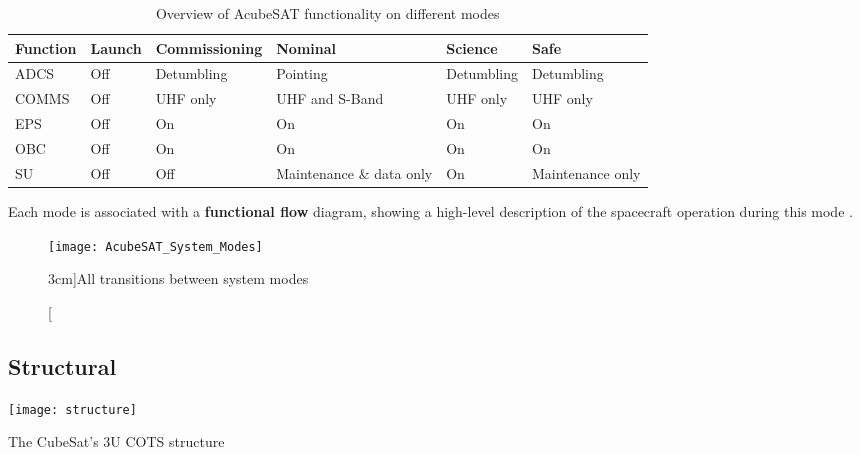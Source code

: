 \documentclass[a4paper,nobib]{tufte-book}
\begin{document}
\begin{table}[h]
	\centering
	\caption{Overview of AcubeSAT functionality on different modes}
	\label{tab:acubesatmodes}
	\begin{tabular}{@{}llllll@{}}
		\toprule
		Function    & Launch & Commissioning  & Nominal                 & Science        & Safe             \\ \midrule
		\acs{ADCS}  & \color{off} Off    & Detumbling     & \color{on} Pointing                & Detumbling     & Detumbling       \\
		\acs{COMMS} & \color{off} Off    & \acs{UHF} only & \color{on} \acs{UHF} and S-Band    & \acs{UHF} only & \acs{UHF} only   \\
		\acs{EPS}   & \color{off} Off    & \color{on} On             & \color{on} On                      & \color{on} On             & \color{on} On               \\
		\acs{OBC}   & \color{off} Off    & \color{on} On             & \color{on} On                      & \color{on} On             & \color{on} On               \\
		\acs{SU}    & \color{off} Off    & \color{off} Off            & Maintenance \& data only & \color{on} On             & Maintenance only \\ \bottomrule
	\end{tabular}
	\vspace{1em}
\end{table}


Each mode is associated with a \textbf{functional flow} diagram, showing a high-level description of the spacecraft operation during this mode \autocite{acubesatteam_acubesat_functional_2021}.

\begin{figure}
	\centering
	\texttt{[image: AcubeSAT\_System\_Modes]}
	\caption[All transitions between system modes][3cm]{All transitions between system modes \parencite{acubesatteam_acubesat_functional_2021}}
	\label{fig:transitions}
\end{figure}


\subsection{Structural}

\begin{marginfigure}[2cm]
	\centering
	\texttt{[image: structure]}
	\caption{The CubeSat's 3U \acs{COTS} structure}
	\label{fig:structure}
\end{marginfigure}
\end{document}
